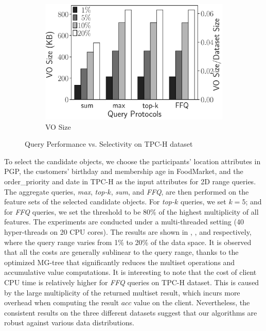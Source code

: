 \begin{figure}[t]
\begin{subfigure}[b]{.33\linewidth}
    \includegraphics[height=\ht\figbox]{exp-figs/aggregate-queries/tpch_vo.eps}
    \caption{VO Size}
  \end{subfigure}
  \caption{Query Performance vs. Selectivity on TPC-H dataset}\label{fig:aggregate-queries:tpch}
\end{figure}

To select the candidate objects, we choose the participants' location attributes in PGP, the customers' birthday and membership age in FoodMarket, and the order\_priority and date in TPC-H as the input attributes for 2D range queries. The aggregate queries, \emph{max}, \emph{top-$k$}, \emph{sum}, and \emph{FFQ}, are then performed on the feature sets of the selected candidate objects. For \emph{top-$k$} queries, we set $k=5$; and for \emph{FFQ} queries, we set the threshold to be 80\% of the highest multiplicity of all features. The experiments are conducted under a multi-threaded setting (40 hyper-threads on 20 CPU cores). The results are shown in , , and  respectively, where the query range varies from 1\% to 20\% of the data space. It is observed that all the costs are generally sublinear to the query range, thanks to the optimized MG-tree that significantly reduces the multiset operations and accumulative value computations.
It is interesting to note that the cost of client CPU time is relatively higher for \emph{FFQ} queries on TPC-H dataset. This is caused by the large multiplicity of the returned multiset result, which incurs more overhead when computing the result $acc$ value on the client.
Nevertheless, the consistent results on the three different datasets suggest that our algorithms are robust against various data distributions.

